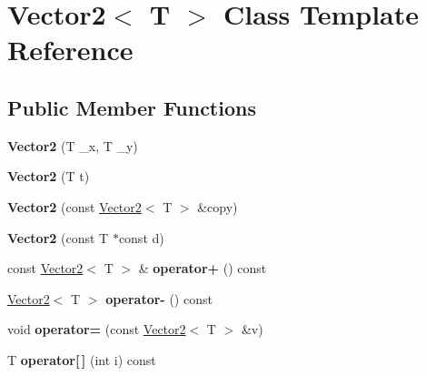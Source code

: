 \hypertarget{class_vector2}{}\section{Vector2$<$ T $>$ Class Template Reference}
\label{class_vector2}
\subsection*{Public Member Functions}
\begin{DoxyCompactItemize}
\item 
\mbox{\label{class_vector2_a8706751917c16eb45fb601fef07f6af6}} 
{\bfseries Vector2} (T \+\_\+x, T \+\_\+y)
\item 
\mbox{\label{class_vector2_ab54dc0aaf08f5c8b0d685397bc50c3d9}} 
{\bfseries Vector2} (T t)
\item 
\mbox{\label{class_vector2_a305608dcc605f038380948d5e7a21bc4}} 
{\bfseries Vector2} (const \mbox{\hyperlink{class_vector2}{Vector2}}$<$ T $>$ \&copy)
\item 
\mbox{\label{class_vector2_accf188c37e1e6e3f854d365b1b3a6097}} 
{\bfseries Vector2} (const T $\ast$const d)
\item 
\mbox{\label{class_vector2_a04a4db9d74ab2fc4d05f276053daa41d}} 
const \mbox{\hyperlink{class_vector2}{Vector2}}$<$ T $>$ \& {\bfseries operator+} () const
\item 
\mbox{\label{class_vector2_a11cbe738104a13aaa7654a03e14f7bc6}} 
\mbox{\hyperlink{class_vector2}{Vector2}}$<$ T $>$ {\bfseries operator-\/} () const
\item 
\mbox{\label{class_vector2_a045d8a0a2932b565c66dd94cae04d4ca}} 
void {\bfseries operator=} (const \mbox{\hyperlink{class_vector2}{Vector2}}$<$ T $>$ \&v)
\item 
\mbox{\label{class_vector2_a074c182d34dec6a562b9a32b1db23f33}} 
T {\bfseries operator\mbox{[}$\,$\mbox{]}} (int i) const
\item 
\mbox{\label{class_vector2_aaeb3c84b725489ad571dba262a644d37}} 

\end{DoxyCompactItemize}
